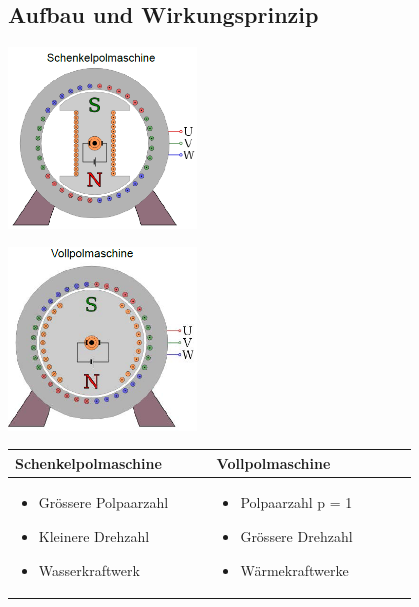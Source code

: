 \subsection{Aufbau und Wirkungsprinzip}
    \begin{minipage}[b]{0.5\linewidth}
    	\includegraphics[width = 5cm]{images/Schenkelpolmaschine}
    \end{minipage}
    \begin{minipage}[b]{0.5\linewidth}
    	\includegraphics[width = 5cm]{images/Vollpolmaschine}
    \end{minipage}
    \begin{tabular}[b]{| C{0.4\linewidth} | C{0.4\linewidth} |}
    	\hline
    	\textbf{Schenkelpolmaschine} &
        \textbf{Vollpolmaschine}
        \\ \hline
        
    	\vspace{-0.7cm}
    	\begin{itemize}
    		\item Grössere Polpaarzahl 
    		\item Kleinere Drehzahl
    		\item Wasserkraftwerk
    	\end{itemize} &
        \vspace{-0.7cm}
        \begin{itemize}
        	\item Polpaarzahl p = 1
        	\item Grössere Drehzahl
        	\item Wärmekraftwerke
        \end{itemize}
        \\ \hline
    \end{tabular}
    \\
    \clearpage
    \pagebreak


